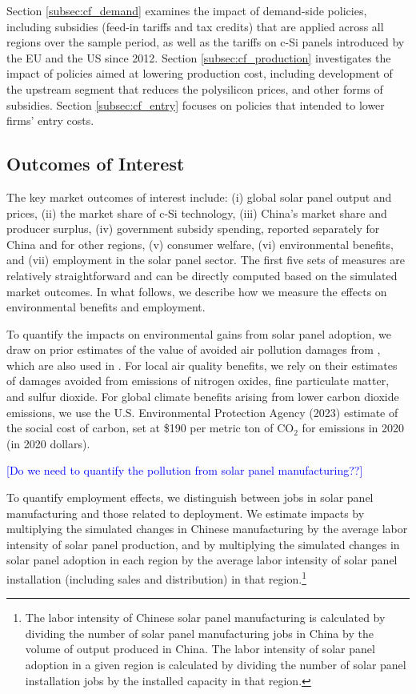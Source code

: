 \documentclass[12pt, letter]{article}
\begin{document}
Section \ref{subsec:cf_demand} examines the impact of demand-side policies, including subsidies (feed-in tariffs and tax credits) that are applied across all regions over the sample period, as well as the tariffs on c-Si panels introduced by the EU and the US since 2012. Section \ref{subsec:cf_production} investigates the impact of policies aimed at lowering production cost, including development of the upstream segment that reduces the polysilicon prices, and other forms of subsidies. Section \ref{subsec:cf_entry} focuses on policies that intended to lower firms' entry costs.

\subsection{Outcomes of Interest}
\label{subsec:cf_outcomes}
The key market outcomes of interest include: (i) global solar panel output and prices, (ii) the market share of c-Si technology, (iii) China's market share and producer surplus, (iv) government subsidy spending, reported separately for China and for other regions, (v) consumer welfare, (vi) environmental benefits, and (vii) employment in the solar panel sector.
The first five sets of measures are relatively straightforward and can be directly computed based on the simulated market outcomes. In what follows, we describe how we measure the effects on environmental benefits and employment.

To quantify the impacts on environmental gains from solar panel adoption, we draw on prior estimates of the value of avoided air pollution damages from \citet{sexton2021heterogeneous}, which are also used in \citet{gerarden2023demanding}. For local air quality benefits, we rely on their estimates of damages avoided from emissions of nitrogen oxides, fine particulate matter, and sulfur dioxide. For global climate benefits arising from lower carbon dioxide emissions, we use the U.S. Environmental Protection Agency (2023) estimate of the social cost of carbon, set at \$190 per metric ton of $\text{CO}_2$ for emissions in 2020 (in 2020 dollars).

\textcolor{blue}{[Do we need to quantify the pollution from solar panel manufacturing??]}

To quantify employment effects, we distinguish between jobs in solar panel manufacturing and those related to deployment. We estimate impacts by multiplying the simulated changes in Chinese manufacturing by the average labor intensity of solar panel production, and by multiplying the simulated changes in solar panel adoption in each region by the average labor intensity of solar panel installation (including sales and distribution) in that region.\footnote{The labor intensity of Chinese solar panel manufacturing is calculated by dividing the number of solar panel manufacturing jobs in China by the volume of output produced in China. The labor intensity of solar panel adoption in a given region is calculated by dividing the number of solar panel installation jobs by the installed capacity in that region.}
\end{document}

